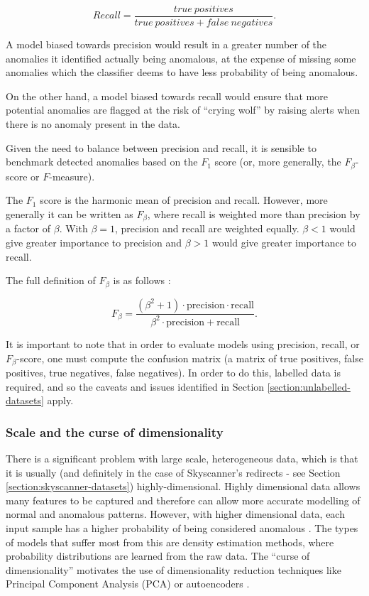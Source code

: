 \documentclass{mpaper}
\begin{document}
$$
Recall = \frac{true \: positives}{true \: positives + false \: negatives}.
$$

A model biased towards precision would result in a greater number of the anomalies it identified actually being anomalous, at the expense of missing some anomalies which the classifier deems to have less probability of being anomalous.

On the other hand, a model biased towards recall would ensure that more potential anomalies are flagged at the risk of ``crying wolf'' by raising alerts when there is no anomaly present in the data.

Given the need to balance between precision and recall, it is sensible to benchmark
detected anomalies based on the $F_1$ score (or, more generally, the $F_\beta$-score or $F$-measure). 

The $F_1$ score is the harmonic mean of precision and recall. However, more generally it can be written as $F_\beta$, where recall is weighted more than precision by a factor of $\beta$. With $\beta = 1$, precision and recall are weighted equally. $\beta < 1$ would give greater importance to precision and $\beta > 1$ would give greater importance to recall. 

The full definition of $F_\beta$ is as follows \citep{fMeasureTruth}:

$$F_{\beta} = \frac{
	(\beta^2 + 1) \cdot \text{precision} \cdot \text{recall}
}{
	\beta^2 \cdot \text{precision} + \text{recall}
}.
$$

It is important to note that in order to evaluate models using precision, recall, or $F_\beta$-score, one must compute the confusion matrix (a matrix of true positives, false positives, true negatives, false negatives). In order to do this, labelled data is required, and so the caveats and issues identified in Section \ref{section:unlabelled-datasets} apply.

\subsubsection{Scale and the curse of dimensionality}
\label{section:curse-of-dimensionality}

There is a significant problem with large scale, heterogeneous data, which is that it is usually (and definitely in the case of Skyscanner's redirects - see Section \ref{section:skyscanner-datasets}) highly-dimensional. Highly dimensional data allows many features to be captured and therefore can allow more accurate modelling of normal and anomalous patterns. However, with higher dimensional data, each input sample has a higher probability of being considered anomalous \citep{DAGMM}. The types of models that suffer most from this are density estimation methods, where probability distributions are learned from the raw data. The ``curse of dimensionality'' motivates the use of dimensionality reduction techniques like Principal Component Analysis (PCA) or autoencoders \citep{DAGMM}.
\end{document}

